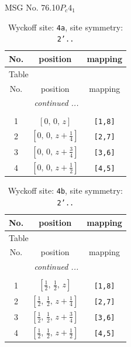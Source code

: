 \documentclass[fleqn,8pt]{jsarticle}
\begin{document}
\setcounter{MaxMatrixCols}{32}

\renewcommand{\tablename}{Table~}
\renewcommand{\figurename}{Figure~}
\begin{center}
\LARGE
MSG No. 76.10\quad$P_{c}4_{1}$
\end{center}
\renewcommand{\arraystretch}{1.2}
\begin{longtable}{ccc}
\caption{Wyckoff site: {\tt 4a}, site symmetry: {\tt 2'..}}
 \\
 \hline \hline
No. & position & mapping \\ \hline \endfirsthead

\multicolumn{2}{l}{\tablename\ \thetable{}} \\
 \hline \hline
No. & position & mapping \\ \hline \endhead

 \hline \hline
\multicolumn{2}{r}{\footnotesize\it continued ...} \\ \endfoot

 \hline \hline
\multicolumn{2}{r}{} \\ \endlastfoot

1 & $\left[ 0,\, 0,\, z \right]$ & {\tt [1,8]} \\ \hline
2 & $\left[ 0,\, 0,\, z + \frac{1}{4} \right]$ & {\tt [2,7]} \\ \hline
3 & $\left[ 0,\, 0,\, z + \frac{3}{4} \right]$ & {\tt [3,6]} \\ \hline
4 & $\left[ 0,\, 0,\, z + \frac{1}{2} \right]$ & {\tt [4,5]} \\
\end{longtable}
\renewcommand{\arraystretch}{1.2}
\begin{longtable}{ccc}
\caption{Wyckoff site: {\tt 4b}, site symmetry: {\tt 2'..}}
 \\
 \hline \hline
No. & position & mapping \\ \hline \endfirsthead

\multicolumn{2}{l}{\tablename\ \thetable{}} \\
 \hline \hline
No. & position & mapping \\ \hline \endhead

 \hline \hline
\multicolumn{2}{r}{\footnotesize\it continued ...} \\ \endfoot

 \hline \hline
\multicolumn{2}{r}{} \\ \endlastfoot

1 & $\left[ \frac{1}{2},\, \frac{1}{2},\, z \right]$ & {\tt [1,8]} \\ \hline
2 & $\left[ \frac{1}{2},\, \frac{1}{2},\, z + \frac{1}{4} \right]$ & {\tt [2,7]} \\ \hline
3 & $\left[ \frac{1}{2},\, \frac{1}{2},\, z + \frac{3}{4} \right]$ & {\tt [3,6]} \\ \hline
4 & $\left[ \frac{1}{2},\, \frac{1}{2},\, z + \frac{1}{2} \right]$ & {\tt [4,5]} \\
\end{longtable}
\end{document}
